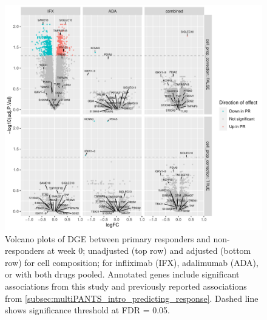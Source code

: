 \begin{figure}
    \centering
    \includegraphics[width=1.0\textwidth,page=1]{mainmatter/figures/chapter_04/plot_gene_set_enrichment.dge_result_volcano_simple_C_1RI_1NI,C_1RA_1NA,C_1R_1N.pdf}
    \caption{Volcano plots of \gls{DGE} between primary responders and non-responders at week 0; unadjusted (top row) and adjusted (bottom row) for cell composition; for infliximab (IFX), adalimumab (ADA), or with both drugs pooled. Annotated genes include significant associations from this study and previously reported associations from \autoref{subsec:multiPANTS_intro_predicting_response}. Dashed line shows significance threshold at FDR = 0.05.}
    \label{fig:multipants_dge_volcano_week_0_R_N}
\end{figure}


